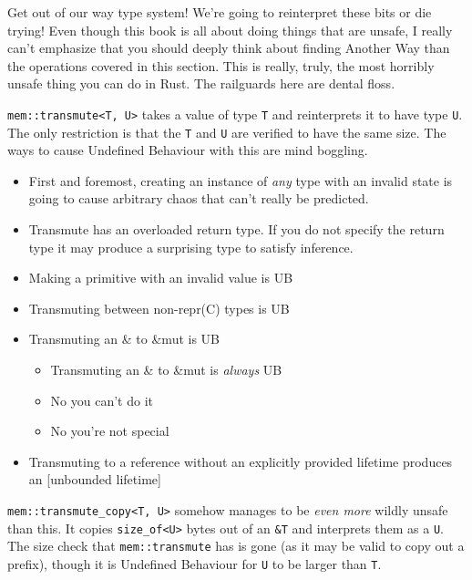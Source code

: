 \documentclass[a4paper,]{book}
\providecommand{\tightlist}{%
  \setlength{\itemsep}{0pt}\setlength{\parskip}{0pt}}
\begin{document}
Get out of our way type system! We're going to reinterpret these bits or
die trying! Even though this book is all about doing things that are
unsafe, I really can't emphasize that you should deeply think about
finding Another Way than the operations covered in this section. This is
really, truly, the most horribly unsafe thing you can do in Rust. The
railguards here are dental floss.

\texttt{mem::transmute\textless{}T,\ U\textgreater{}} takes a value of
type \texttt{T} and reinterprets it to have type \texttt{U}. The only
restriction is that the \texttt{T} and \texttt{U} are verified to have
the same size. The ways to cause Undefined Behaviour with this are mind
boggling.

\begin{itemize}
\tightlist
\item
  First and foremost, creating an instance of \emph{any} type with an
  invalid state is going to cause arbitrary chaos that can't really be
  predicted.
\item
  Transmute has an overloaded return type. If you do not specify the
  return type it may produce a surprising type to satisfy inference.
\item
  Making a primitive with an invalid value is UB
\item
  Transmuting between non-repr(C) types is UB
\item
  Transmuting an \& to \&mut is UB

  \begin{itemize}
  \tightlist
  \item
    Transmuting an \& to \&mut is \emph{always} UB
  \item
    No you can't do it
  \item
    No you're not special
  \end{itemize}
\item
  Transmuting to a reference without an explicitly provided lifetime
  produces an {[}unbounded lifetime{]}
\end{itemize}

\texttt{mem::transmute\_copy\textless{}T,\ U\textgreater{}} somehow
manages to be \emph{even more} wildly unsafe than this. It copies
\texttt{size\_of\textless{}U\textgreater{}} bytes out of an \texttt{\&T}
and interprets them as a \texttt{U}. The size check that
\texttt{mem::transmute} has is gone (as it may be valid to copy out a
prefix), though it is Undefined Behaviour for \texttt{U} to be larger
than \texttt{T}.
\end{document}
